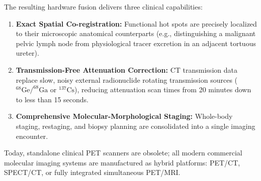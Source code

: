 \documentclass[11pt,a4paper]{article}
\begin{document}
The resulting hardware fusion delivers three clinical capabilities:
\begin{enumerate}
    \item \textbf{Exact Spatial Co-registration:} Functional hot spots are precisely localized to their microscopic anatomical counterparts (e.g., distinguishing a malignant pelvic lymph node from physiological tracer excretion in an adjacent tortuous ureter).
    \item \textbf{Transmission-Free Attenuation Correction:} CT transmission data replace slow, noisy external radionuclide rotating transmission sources ($^{68}\text{Ge}/^{68}\text{Ga}$ or $^{137}\text{Cs}$), reducing attenuation scan times from 20 minutes down to less than 15 seconds.
    \item \textbf{Comprehensive Molecular-Morphological Staging:} Whole-body staging, restaging, and biopsy planning are consolidated into a single imaging encounter.
\end{enumerate}

Today, standalone clinical PET scanners are obsolete; all modern commercial molecular imaging systems are manufactured as hybrid platforms: PET/CT, SPECT/CT, or fully integrated simultaneous PET/MRI.
\end{document}
